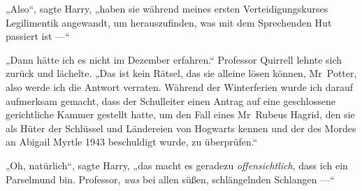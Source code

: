 „Also“, sagte Harry, „haben sie während meines ersten Verteidigungskurses Legilimentik angewandt, um herauszufinden, was mit dem Sprechenden Hut passiert ist —“

„Dann hätte ich es nicht im Dezember erfahren.“ Professor Quirrell lehnte sich zurück und lächelte.
„Das ist kein Rätsel, das sie alleine lösen können, Mr~Potter, also werde ich die Antwort verraten. Während der Winterferien wurde ich darauf aufmerksam gemacht, dass der Schulleiter einen Antrag auf eine geschlossene gerichtliche Kammer gestellt hatte, um den Fall eines Mr~Rubeus Hagrid, den sie als Hüter der Schlüssel und Ländereien von Hogwarts kennen und der des Mordes an Abigail Myrtle 1943 beschuldigt wurde, zu überprüfen.“

„Oh, natürlich“, sagte Harry, „das macht es geradezu \emph{offensichtlich}, dass ich ein Parselmund bin. Professor, \emph{was} bei allen süßen, schlängelnden Schlangen —“

